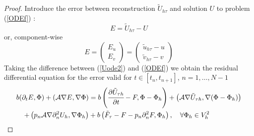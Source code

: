 \documentclass{imanum}
\begin{document}
\begin{proof}
Introduce the error between reconstruction $\tilde{U}_{h\tau}$ and solution
$U$ to problem (\ref{ODEf}) :
\begin{equation}
  E = \tilde{U}_{h\tau} - U
\end{equation}
or, component-wise
$$
E = \begin{pmatrix}
     E_u\\
     E_v
   \end{pmatrix} = \begin{pmatrix}
     \tilde{u}_{h\tau} - u\\
     \tilde{v}_{h\tau} - v
   \end{pmatrix}
$$
Taking the difference between (\ref{Uode2}) and (\ref{ODEf}) we obtain the residual differential equation for the error valid for $t \in [t_n, t_{n
+ 1}]$, $n = 1, \ldots, N-1$
\begin{align}  
\label{errode}{b}({\partial}_{t}E,{\Phi})+(\mathcal{A}{\nabla} E,{\nabla} {\Phi})
  &={b} \left(\cfrac{{\partial} \tilde{U}_{{\tau} h}}{\partial t}-F,{\Phi}-{\Phi}_{h}\right)+\left(\mathcal{A}{\nabla} \tilde{U}_{{\tau} h},{\nabla} ({\Phi}-{\Phi}_{h})\right)\\
\notag  +\left(p_n \mathcal{A}{\nabla} {\partial}_{n}^{2} U_{h},{\nabla} {\Phi}_{h}\right)
  &+{b}\left( \tilde{F}_\tau -F - p_n \partial^2_n F, \Phi_h\right), \hspace{1em} \forall \Phi_h \in V_h^2 
\end{align}


\end{proof}
\end{document}
